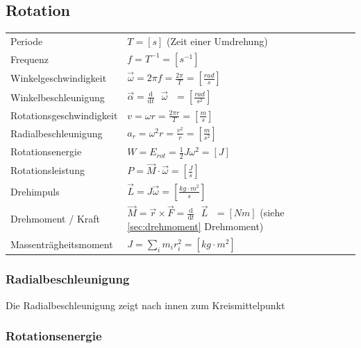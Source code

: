 \documentclass[a4paper]{scrartcl}
\newcommand{\abl}[2]{\frac{\text{d}}{\text{d}#2}\text{ } #1 \text{ }}
\begin{document}
\subsection{Rotation}
	\begin{tabu} {l X}
		Periode
		& $T = \left[ s \right]$ (Zeit einer Umdrehung) \\
		Frequenz
		& $f = T^{-1} = \left[ s^{-1} \right]$ \\
		Winkelgeschwindigkeit
		& $\vec{\omega} = 2\pi f = \frac{2\pi}{T} = \left[ \frac{rad}{s} \right]$ \\
		Winkelbeschleunigung
		& $\vec{\alpha} = \abl{\vec{\omega}}{t} = \left[ \frac{rad}{s^2} \right]$ \\
		Rotationsgeschwindigkeit
		& $v = \omega r = \frac{2\pi r}{T} = \left[ \frac{m}{s} \right]$ \\
		Radialbeschleunigung
		& $a_r = \omega^2 r = \frac{v^2}{r} = \left[ \frac{m}{s^2} \right]$ \\
		Rotationsenergie
		& $W = E_{rot} = \frac{1}{2} J \omega^2 = \left[ J \right]$ \\
		Rotationsleistung
		& $P = \vec{M} \cdot \vec{\omega} = \left[ \frac{J}{s} \right]$ \\
		Drehimpuls
		& $\vec{L} = J \vec{\omega} = \left[ \frac{kg \cdot m^2}{s} \right]$ \\
		Drehmoment / Kraft
		& $\vec{M} = \vec{r} \times \vec{F} = \abl{\vec{L}}{t} = \left[ Nm \right]$ (siehe \ref{sec:drehmoment} Drehmoment) \\
		Massenträgheitsmoment
		& $J = \sum_i{m_i r_i^2} = \left[kg \cdot m^2 \right]$
	\end{tabu}

\subsubsection{Radialbeschleunigung}
	Die Radialbeschleunigung zeigt nach innen zum Kreismittelpunkt

\subsubsection{Rotationsenergie}

\end{document}
